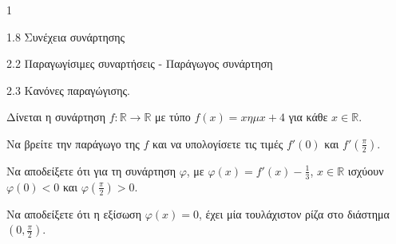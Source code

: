 \begin{ylh}{1}
    \item 1.8 Συνέχεια συνάρτησης
    \item 2.2 Παραγωγίσιμες συναρτήσεις - Παράγωγος συνάρτηση
    \item 2.3 Κανόνες παραγώγισης.
\end{ylh}
Δίνεται η συνάρτηση $f : \mathbb{R} \to \mathbb{R}$ με τύπο $f(x) = x \eta \mu x + 4$ για κάθε $x \in \mathbb{R}$.
\begin{alist}
\item Να βρείτε την παράγωγο της $f$ και να υπολογίσετε τις τιμές $f'(0)$ και $f'\left(\frac{\pi}{2}\right)$. 
\item Να αποδείξετε ότι για τη συνάρτηση $\varphi$, με $\varphi(x) = f'(x) - \frac{1}{3}$, $x \in \mathbb{R}$ ισχύουν $\varphi(0) < 0$ και $\varphi\left(\frac{\pi}{2}\right) > 0$. 
\item Να αποδείξετε ότι η εξίσωση $\varphi(x)=0$, έχει μία τουλάχιστον ρίζα στο διάστημα $\left(0, \frac{\pi}{2}\right)$. 
\end{alist}